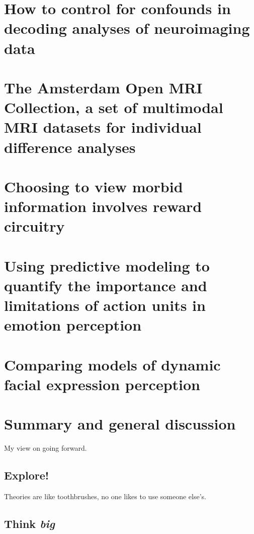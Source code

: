 \documentclass[12pt,american,a4paper,oneside,]{memoir} %
\begin{document}
\hypertarget{confounds-decoding}{%
\chapter{How to control for confounds in decoding analyses of neuroimaging data}\label{confounds-decoding}}

\hypertarget{AOMIC}{%
\chapter{The Amsterdam Open MRI Collection, a set of multimodal MRI datasets for individual difference analyses}\label{AOMIC}}

\hypertarget{morbid-curiosity}{%
\chapter{Choosing to view morbid information involves reward circuitry}\label{morbid-curiosity}}

\hypertarget{au-limitations}{%
\chapter{Using predictive modeling to quantify the importance and limitations of action units in emotion perception}\label{au-limitations}}

\hypertarget{facial-expression-models}{%
\chapter{Comparing models of dynamic facial expression perception}\label{facial-expression-models}}

\hypertarget{summary-and-general-discussion}{%
\chapter{Summary and general discussion}\label{summary-and-general-discussion}}

My view on going forward.

\hypertarget{explore}{%
\section{Explore!}\label{explore}}

Theories are like toothbrushes, no one likes to use someone else's.

\hypertarget{think-big}{%
\section{\texorpdfstring{Think \emph{big}}{Think big}}\label{think-big}}
\end{document}
